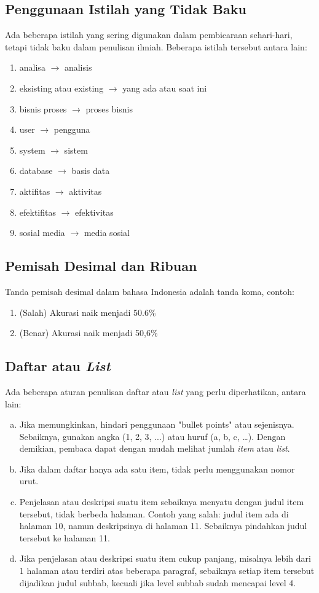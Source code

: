 \subsection{Penggunaan Istilah yang Tidak Baku}
Ada beberapa istilah yang sering digunakan dalam pembicaraan sehari-hari, tetapi tidak baku dalam penulisan ilmiah.
Beberapa istilah tersebut antara lain:
\begin{enumerate}
  \item analisa $\rightarrow$ analisis
  \item eksisting atau existing $\rightarrow$ yang ada atau saat ini
  \item bisnis proses $\rightarrow$ proses bisnis
  \item user $\rightarrow$ pengguna
  \item system $\rightarrow$ sistem
  \item database $\rightarrow$ basis data
  \item aktifitas $\rightarrow$ aktivitas
  \item efektifitas $\rightarrow$ efektivitas
  \item sosial media $\rightarrow$ media sosial
\end{enumerate}

\subsection{Pemisah Desimal dan Ribuan}
Tanda pemisah desimal dalam bahasa Indonesia adalah tanda koma, contoh:
\begin{enumerate}
  \item (Salah) Akurasi naik menjadi 50.6\%
  \item (Benar) Akurasi naik menjadi 50,6\%
\end{enumerate}

\subsection{Daftar atau \textit{List}}
Ada beberapa aturan penulisan daftar atau \textit{list} yang perlu diperhatikan, antara lain:
\begin{enumerate}[a)]
\item Jika memungkinkan, hindari penggunaan "bullet points" atau sejenisnya. Sebaiknya, gunakan angka (1, 2, 3, ...) atau huruf (a, b, c, …). Dengan demikian, pembaca dapat dengan mudah melihat jumlah \textit{item} atau \textit{list}.
\item Jika dalam daftar hanya ada satu item, tidak perlu menggunakan nomor urut.
\item Penjelasan atau deskripsi suatu item sebaiknya menyatu dengan judul item tersebut, tidak berbeda halaman. Contoh yang salah: judul item ada di halaman 10, namun deskripsinya di halaman 11. Sebaiknya pindahkan judul tersebut ke halaman 11.
\item Jika penjelasan atau deskripsi suatu item cukup panjang, misalnya lebih dari 1 halaman atau terdiri atas beberapa paragraf, sebaiknya setiap item tersebut dijadikan judul subbab, kecuali jika level subbab sudah mencapai level 4.
\end{enumerate}

